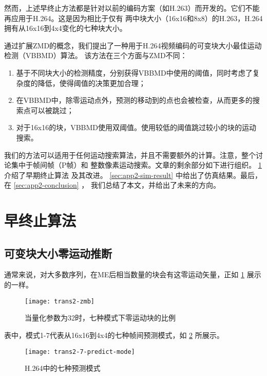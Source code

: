 然而，上述早终止方法都是针对以前的编码方案（如H.263）而开发的。它们不能再应用于H.264。这是因为相比于仅有
两中块大小（16x16和8x8）的H.263，H.264拥有从16x16到4x4变化的七种块大小。

通过扩展ZMD的概念，我们提出了一种用于H.264视频编码的可变块大小最佳运动检测（VBBMD）算法。
该方法在三个方面与ZMD不同：

\begin{enumerate}
  \item 基于不同块大小的检测精度，分别获得VBBMD中使用的阈值，同时考虑了复杂度的降低，使得阈值的决策更加合理；
  \item 在VBBMD中，除零运动点外，预测的移动到的点也会被检查，从而更多的搜索点可以被跳过；
  \item 对于16x16的块，VBBMD使用双阈值。使用较低的阈值跳过较小的块的运动搜索。
\end{enumerate}

我们的方法可以适用于任何运动搜索算法，并且不需要额外的计算。注意，整个讨论集中于帧间帧（P帧）和
整数像素运动搜索。文章的剩余部分如下进行组织。 \ref{sec:app2-early-termination} 介绍了早期终止算法
及其改进。 \ref{sec:app2-sim-result} 中给出了仿真结果。最后，在 \ref{sec:app2-conclusion} ，
我们总结了本文，并给出了未来的方向。

\section{早终止算法}
\label{sec:app2-early-termination}

\subsection{可变块大小零运动推断}

通常来说，对大多数序列，在ME后相当数量的块会有这零运动矢量，正如 \ref{fig:trans2-zmb} 展示的一样。


\begin{figure}[H] %
  \centering
  \texttt{[image: trans2-zmb]}
  \caption{当量化参数为32时，七种模式下零运动块的比例}
  \label{fig:trans2-zmb}
\end{figure}

表中，模式1-7代表从16x16到4x4的七种帧间预测模式，如 \ref{fig:trans2-7-predict-mode} 所展示。

\begin{figure}[H] %
  \centering
  \texttt{[image: trans2-7-predict-mode]}
  \caption{H.264中的七种预测模式}
  \label{fig:trans2-7-predict-mode}
\end{figure}


